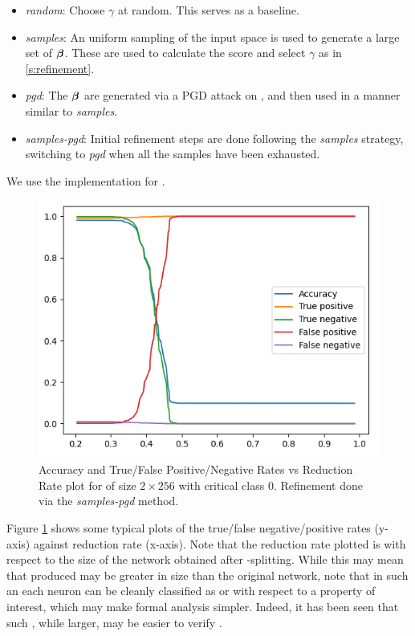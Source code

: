 \begin{itemize}
    \item \textit{random}: Choose $\gamma$ at random. This serves as a
        baseline.
    \item \textit{samples}: An uniform sampling of the input space is used to
        generate a large set of \gencex $\boldsymbol{\beta}$. These are used to
        calculate the score and select $\gamma$ as in 
        \ref{s:refinement}.
    \item \textit{pgd}: The $\boldsymbol{\beta}$ are generated via a PGD
        \cite{pgd, pgd-attack} attack on \abs, and then used in a manner similar
        to \textit{samples}.
    \item \textit{samples-pgd}: Initial refinement steps are done following the
        \textit{samples} strategy, switching to \textit{pgd} when all the
        samples have been exhausted.
\end{itemize}

We use the \abcrown implementation for \pgd.

\begin{figure}
    \includegraphics[scale=0.6]{figs/mnist_2_256_compr_pgd-after-samples.png}
    \caption{Accuracy and True/False Positive/Negative Rates vs Reduction Rate
        plot for \mnist of size $2 \times 256$ with critical class 0. Refinement
    done via the \textit{samples-pgd} method. }
    \label{f:mnist-class}
\end{figure}

Figure \ref{f:mnist-class} shows some typical plots of the true/false
negative/positive rates (y-axis) against reduction rate (x-axis). Note that the
reduction rate plotted is with respect to the size of the network obtained after
\inc-\dec splitting. While this may mean that \abs produced may be greater in
size than the original network, note that in such an \abs each neuron can be
cleanly classified as \inc or \dec with respect to a property of interest, which
may make formal analysis simpler. Indeed, it has been seen that such \abs, while
larger, may be easier to verify \cite{cegar-nn}.

